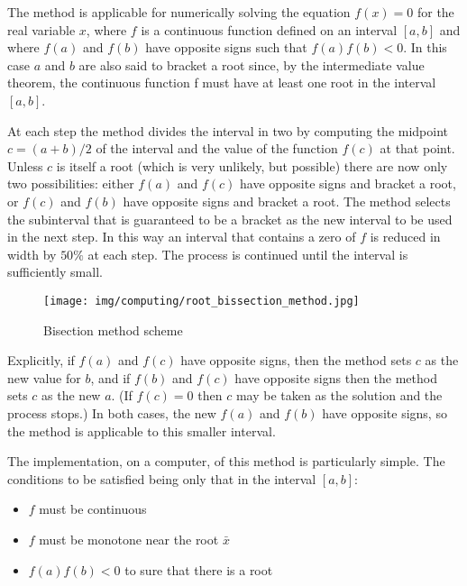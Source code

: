 	The method is applicable for numerically solving the equation $f(x) = 0$ for the real variable $x$, where $f$ is a continuous function defined on an interval $[a, b]$ and where $f(a)$ and $f(b)$ have opposite signs such that $f(a)f(b)<0$. In this case $a$ and $b$ are also said to bracket a root since, by the intermediate value theorem, the continuous function f must have at least one root in the interval $[a, b]$.

	At each step the method divides the interval in two by computing the midpoint $c = (a+b) / 2$ of the interval and the value of the function $f(c)$ at that point. Unless $c$ is itself a root (which is very unlikely, but possible) there are now only two possibilities: either $f(a)$ and $f(c)$ have opposite signs and bracket a root, or $f(c)$ and $f(b)$ have opposite signs and bracket a root. The method selects the subinterval that is guaranteed to be a bracket as the new interval to be used in the next step. In this way an interval that contains a zero of $f$ is reduced in width by $50\%$ at each step. The process is continued until the interval is sufficiently small.

	\begin{figure}[H]
		\centering
		\texttt{[image: img/computing/root\_bissection\_method.jpg]}
		\caption{Bisection method scheme}
	\end{figure}

	Explicitly, if $f(a)$ and $f(c)$ have opposite signs, then the method sets $c$ as the new value for $b$, and if $f(b)$ and $f(c)$ have opposite signs then the method sets $c$ as the new $a$. (If $f(c)=0$ then $c$ may be taken as the solution and the process stops.) In both cases, the new $f(a)$ and $f(b)$ have opposite signs, so the method is applicable to this smaller interval.
	
	The implementation, on a computer, of this method is particularly simple. The conditions to be satisfied being only that in the interval $[a,b]$:
	\begin{itemize}
		\item $f$ must be continuous

		\item $f$ must be monotone near the root $\bar{x}$
		
		\item $f(a)f(b)<0$ to sure that there is a root
	\end{itemize}
	
